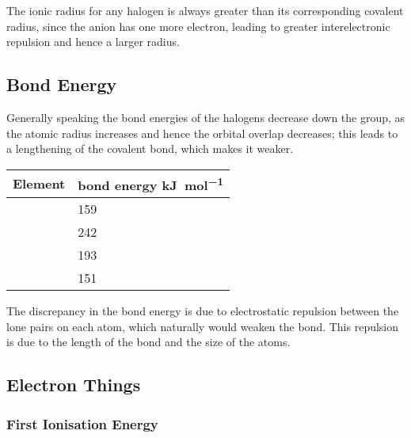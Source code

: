 			The ionic radius for any halogen is always greater than its corresponding covalent radius, since the anion has one more electron,
			leading to greater interelectronic repulsion and hence a larger radius.




		\pagebreak
		\subsection{Bond Energy}

			Generally speaking the bond energies of the halogens decrease down the group, as the atomic radius increases and hence the
			orbital overlap decreases; this leads to a lengthening of the covalent bond, which makes it weaker.

			\begin{center}\begin{table}[htb]\renewcommand{\arraystretch}{1.5}
			\begin{tabu} to \textwidth {X[c,m] | X[c,m]}

				Element		&	 bond energy \si{\kilo\joule\per\mole}	\\	\hline
						&	\num{159}										\\	\hline
				\ch{\Cl}	&	\num{242}										\\	\hline
						&	\num{193}										\\	\hline
						&	\num{151}										\\	\hline

			\end{tabu}
			\end{table}\end{center}\vspace{-10mm}

			The discrepancy in the  bond energy is due to electrostatic repulsion between the lone pairs on each  atom, which
			naturally would weaken the bond. This repulsion is due to the length of the bond and the size of the atoms.



		\subsection{Electron Things}

			\subsubsection{First Ionisation Energy}


